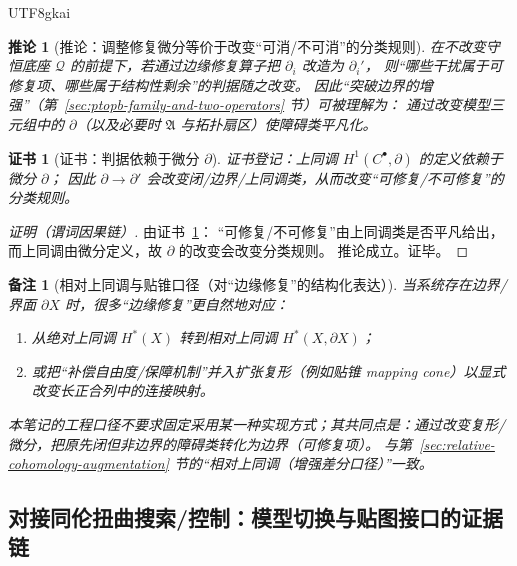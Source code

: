 \documentclass[12pt]{article}
\newtheorem{corollary}{推论}[section]
\newtheorem{remark}{备注}[section]
\newtheorem{Certificate}{证书}[section]
\begin{document}
\begin{CJK*}{UTF8}{gkai}
\begin{corollary}[推论：调整修复微分等价于改变“可消/不可消”的分类规则]
\label{cor:edge-repair-changes-repairability-classification}
在不改变守恒底座 $\mathcal{Q}$ 的前提下，若通过边缘修复算子把 $\partial_i$ 改造为 $\partial_i'$，
则“哪些干扰属于可修复项、哪些属于结构性剩余”的判据随之改变。
因此“突破边界的增强”（第~\ref{sec:ptopb-family-and-two-operators} 节）可被理解为：
通过改变模型三元组中的 $\partial$（以及必要时 $\mathfrak{A}$ 与拓扑扇区）使障碍类平凡化。
\end{corollary}

\begin{Certificate}[证书：判据依赖于微分 $\partial$]
\label{cert:edge-repair-changes-repairability-classification}
证书登记：上同调 $H^1(C^\bullet,\partial)$ 的定义依赖于微分 $\partial$；
因此 $\partial\to\partial'$ 会改变闭/边界/上同调类，从而改变“可修复/不可修复”的分类规则。
\end{Certificate}

\begin{proof}[证明（谓词因果链）]
由证书~\ref{cert:edge-repair-changes-repairability-classification}：
“可修复/不可修复”由上同调类是否平凡给出，而上同调由微分定义，故 $\partial$ 的改变会改变分类规则。
推论成立。证毕。
\end{proof}

\begin{remark}[相对上同调与贴锥口径（对“边缘修复”的结构化表达）]
当系统存在边界/界面 $\partial X$ 时，很多“边缘修复”更自然地对应：
\begin{enumerate}
  \item 从绝对上同调 $H^\ast(X)$ 转到相对上同调 $H^\ast(X,\partial X)$；
  \item 或把“补偿自由度/保障机制”并入扩张复形（例如贴锥 \emph{mapping cone}）以显式改变长正合列中的连接映射。
\end{enumerate}
本笔记的工程口径不要求固定采用某一种实现方式；其共同点是：通过改变复形/微分，把原先闭但非边界的障碍类转化为边界（可修复项）。
与第~\ref{sec:relative-cohomology-augmentation} 节的“相对上同调（增强差分口径）”一致。
\end{remark}

\subsection{对接同伦扭曲搜索/控制：模型切换与贴图接口的证据链}
\label{sec:triple-switching-aligns-with-twisted-homotopy}


\end{CJK*}
\end{document}
